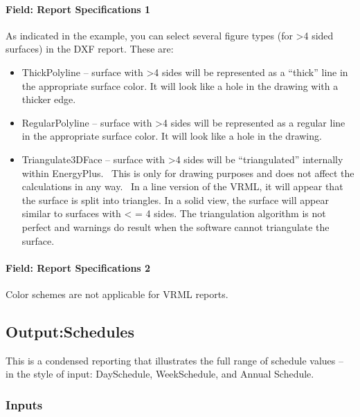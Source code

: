\paragraph{Field: Report Specifications 1}\label{field-report-specifications-1-1}

As indicated in the example, you can select several figure types (for \textgreater{}4 sided surfaces) in the DXF report. These are:

\begin{itemize}
\item
  ThickPolyline -- surface with \textgreater{}4 sides will be represented as a ``thick'' line in the appropriate surface color. It will look like a hole in the drawing with a thicker edge.
\item
  RegularPolyline -- surface with \textgreater{}4 sides will be represented as a regular line in the appropriate surface color. It will look like a hole in the drawing.
\item
  Triangulate3DFace -- surface with \textgreater{}4 sides will be ``triangulated'' internally within EnergyPlus.~ This is only for drawing purposes and does not affect the calculations in any way.~ In a line version of the VRML, it will appear that the surface is split into triangles. In a solid view, the surface will appear similar to surfaces with \textless{} = 4 sides. The triangulation algorithm is not perfect and warnings do result when the software cannot triangulate the surface.
\end{itemize}

\paragraph{Field: Report Specifications 2}\label{field-report-specifications-2-1}

Color schemes are not applicable for VRML reports.

\subsection{Output:Schedules}\label{outputschedules}

This is a condensed reporting that illustrates the full range of schedule values -- in the style of input: DaySchedule, WeekSchedule, and Annual Schedule.

\subsubsection{Inputs}\label{inputs-2-034}

